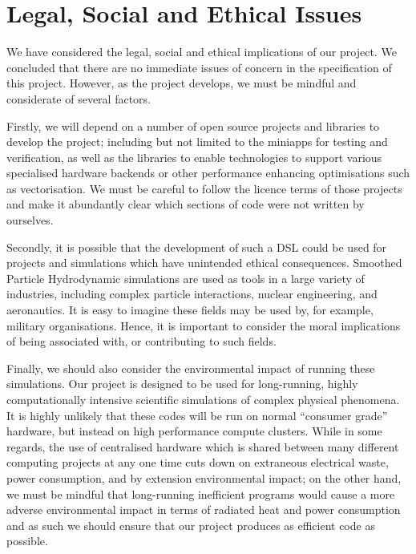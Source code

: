 \chapter{Legal, Social and Ethical Issues}

We have considered the legal, social and ethical implications of our project. We concluded that there are no immediate issues of concern in the specification of this project. However, as the project develops, we must be mindful and considerate of several factors. 

Firstly, we will depend on a number of open source projects and libraries to develop the project; including but not limited to the miniapps for testing and verification, as well as the libraries to enable technologies to support various specialised hardware backends or other performance enhancing optimisations such as vectorisation. We must be careful to follow the licence terms of those projects and make it abundantly clear which sections of code were not written by ourselves. 

Secondly, it is possible that the development of such a DSL could be used for projects and simulations which have unintended ethical consequences. Smoothed Particle Hydrodynamic simulations are used as tools in a large variety of industries, including complex particle interactions, nuclear engineering, and aeronautics. It is easy to imagine these fields may be used by, for example, military organisations. Hence, it is important to consider the moral implications of being associated with, or contributing to such fields.

Finally, we should also consider the environmental impact of running these simulations. Our project is designed to be used for long-running, highly computationally intensive scientific simulations of complex physical phenomena. It is highly unlikely that these codes will be run on normal ``consumer grade'' hardware, but instead on high performance compute clusters. While in some regards, the use of centralised hardware which is shared between many different computing projects at any one time cuts down on extraneous electrical waste, power consumption, and by extension environmental impact; on the other hand, we must be mindful that long-running inefficient programs would cause a more adverse environmental impact in terms of radiated heat and power consumption and as such we should ensure that our project produces as efficient code as possible.